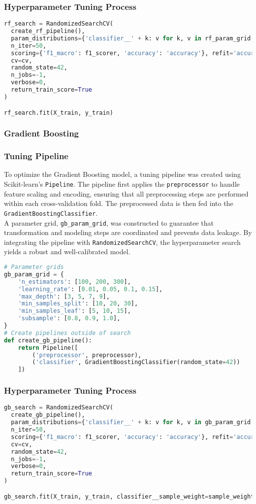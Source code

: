 \documentclass[twoside,final]{hcmut-report}
\begin{document}
\subsubsection*{Hyperparameter Tuning Process}
\begin{lstlisting}[language=python]
rf_search = RandomizedSearchCV(
  create_rf_pipeline(),
  param_distributions={'classifier__' + k: v for k, v in rf_param_grid.items()},
  n_iter=50,
  scoring={'f1_macro': f1_scorer, 'accuracy': 'accuracy'}, refit='accuracy',
  cv=cv,
  random_state=42,
  n_jobs=-1,
  verbose=0,
  return_train_score=True
)

rf_search.fit(X_train, y_train)
\end{lstlisting}
\subsubsection{Gradient Boosting}
\subsubsection*{Tuning Pipeline}
To optimize the Gradient Boosting model, a tuning pipeline was created using Scikit-learn's \texttt{Pipeline}. The pipeline first applies the \texttt{preprocessor} to handle feature scaling and encoding, ensuring that all preprocessing steps are performed within each cross-validation fold. The preprocessed data is then fed into the \texttt{GradientBoostingClassifier}.\\

A parameter grid, \texttt{gb\_param\_grid}, was constructed to guarantee that transformation and modeling steps are coordinated and prevents data leakage. By integrating the pipeline with \texttt{RandomizedSearchCV}, the hyperparameter search yields a robust and well-calibrated model.
\begin{lstlisting}[language=python]
# Parameter grids
gb_param_grid = {
    'n_estimators': [100, 200, 300],
    'learning_rate': [0.01, 0.05, 0.1, 0.15],
    'max_depth': [3, 5, 7, 9],
    'min_samples_split': [10, 20, 30],
    'min_samples_leaf': [5, 10, 15],
    'subsample': [0.8, 0.9, 1.0],
}
# Create pipelines outside of search
def create_gb_pipeline():
    return Pipeline([
        ('preprocessor', preprocessor),
        ('classifier', GradientBoostingClassifier(random_state=42))
    ])
\end{lstlisting}
\subsubsection*{Hyperparameter Tuning Process}
\begin{lstlisting}[language=python]
gb_search = RandomizedSearchCV(
  create_gb_pipeline(),
  param_distributions={'classifier__' + k: v for k, v in gb_param_grid.items()},
  n_iter=50,
  scoring={'f1_macro': f1_scorer, 'accuracy': 'accuracy'}, refit='accuracy',
  cv=cv,
  random_state=42,
  n_jobs=-1,
  verbose=0,
  return_train_score=True
)

gb_search.fit(X_train, y_train, classifier__sample_weight=sample_weights)
\end{lstlisting}
\end{document}
